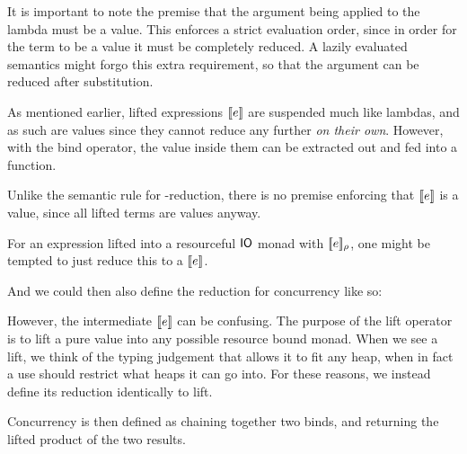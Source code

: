 It is important to note the premise that the argument being applied to
the lambda must be a value. This enforces a strict evaluation order,
since in order for the term to be a value it must be completely
reduced. A lazily evaluated semantics might forgo this extra
requirement, so that the argument can be reduced after substitution.

As mentioned earlier, lifted expressions $\lift{e}$ are suspended much
like lambdas, and as such are values since they cannot reduce any
further \textit{on their own}. However, with the bind operator, the
value inside them can be extracted out and fed into a function.
\begin{mathpar}
\end{mathpar}

Unlike the semantic rule for \beta-reduction, there is no premise
enforcing that $\lift{e}$ is a value, since all lifted terms are
values anyway.

For an expression lifted into a resourceful $\IO$ monad with
$\use{\rho}{e}$, one might be tempted to just reduce this to a $\lift{e}$.
\begin{mathpar}
\end{mathpar}

And we could then also define the reduction for concurrency like so:
\begin{mathpar}
\end{mathpar}

However, the intermediate $\lift{e}$ can be confusing. The purpose of
the lift operator is to lift a pure value into any possible resource
bound monad. When we see a lift, we think of the typing judgement that
allows it to fit any heap, when in fact a use should restrict what
heaps it can go into. For these reasons, we instead define its
reduction identically to lift.
\begin{mathpar}
\end{mathpar}

Concurrency is then defined as chaining together two binds, and
returning the lifted product of the two results.
\begin{mathpar}
\end{mathpar}

